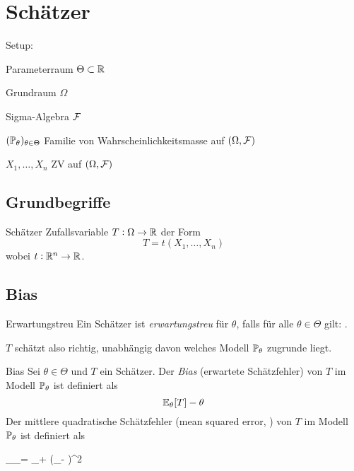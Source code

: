 \section*{Schätzer}%
\label{sec:schatzer}

Setup:
\begin{itemize*}
	\item Parameterraum $\Theta \subset \mathbb{R}$
\item Grundraum $\Omega$
	\item Sigma-Algebra $\mathcal{F}$
	\item $(\mathbb{P}_\theta)_{\theta \in \Theta}$ Familie von Wahrscheinlichkeitsmasse auf $(\Omega, \mathcal{F})$
	\item $X_1 , \ldots , X_n$ ZV auf $(\Omega, \mathcal{F})$
\end{itemize*}

\subsection*{Grundbegriffe}%
\label{sub:grundbegriffe}

\begin{definition}{Schätzer}
	Zufallsvariable $T : \Omega \rightarrow \mathbb{R}$ der Form
	\begin{equation*}
		T = t(X_1, \ldots , X_n)
	\end{equation*}
	wobei $t: \mathbb{R}^n \rightarrow \mathbb{R}$.
\end{definition}


\subsection*{Bias}%
\label{sub:bias}

\begin{definition}{Erwartungstreu}
	Ein Schätzer ist \emph{erwartungstreu} für $\theta$, falls für alle $\theta \in \Theta$ gilt: \inlineieq{\E_\theta
	[T] = \theta}.
\end{definition}
$T$ schätzt also richtig, unabhängig davon welches Modell $\mathbb{P}_\theta$ zugrunde liegt.

\begin{definition}{Bias}
	Sei $\theta \in \Theta$ und $T$ ein Schätzer. Der \emph{Bias} (erwartete Schätzfehler) von $T$ im Modell $\mathbb{P}_\theta$
	ist definiert als
	\begin{equation*}
		\mathbb{E}_\theta [T] - \theta
	\end{equation*}
	Der mittlere quadratische Schätzfehler (\glqq mean squared error\grqq{}, ) von $T$ im Modell $\mathbb{P}_\theta$ ist
	definiert als
	\begin{iequation}
		\mse_\theta [T] \coloneqq \E_\theta {} = \Var_\theta [T] + (\E_\theta [T] - \theta)^2
	\end{iequation}
\end{definition}

